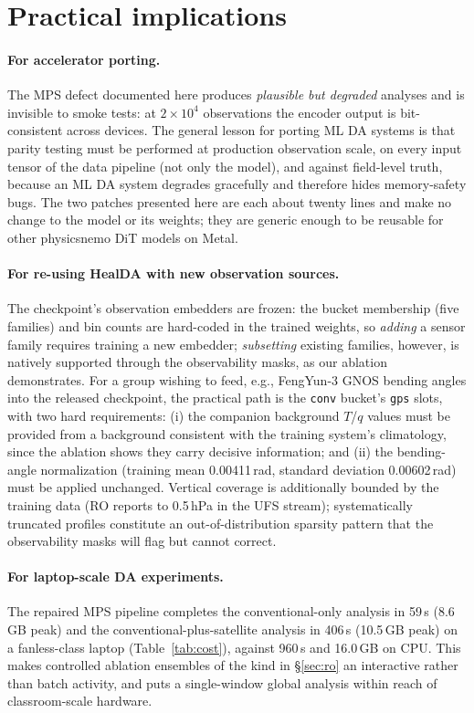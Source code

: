 \documentclass[twocolumn,11pt]{article}
\begin{document}
\section{Practical implications}\label{sec:implications}

\paragraph{For accelerator porting.} The MPS defect documented here
produces \emph{plausible but degraded} analyses and is invisible to
smoke tests: at $2\times10^{4}$ observations the encoder output is
bit-consistent across devices. The general lesson for porting ML DA
systems is that parity testing must be performed at production
observation scale, on every input tensor of the data pipeline (not
only the model), and against field-level truth, because an ML DA
system degrades gracefully and therefore hides memory-safety bugs.
The two patches presented here are each about twenty lines and make
no change to the model or its weights; they are generic enough to be
reusable for other physicsnemo DiT models on Metal.

\paragraph{For re-using HealDA with new observation sources.}
The checkpoint's observation embedders are frozen: the bucket
membership (five families) and bin counts are hard-coded in the
trained weights, so \emph{adding} a sensor family requires training a
new embedder; \emph{subsetting} existing families, however, is natively
supported through the observability masks, as our ablation
demonstrates. For a group wishing to feed, e.g., FengYun-3 GNOS
bending angles \citep{liao2016gnos} into the released checkpoint, the
practical path is the \texttt{conv} bucket's \texttt{gps} slots,
with two hard requirements: (i) the companion background $T$/$q$
values must be provided from a background consistent with the
training system's climatology, since the ablation shows they carry
decisive information; and (ii) the bending-angle normalization
(training mean \num{0.00411}\,rad, standard deviation
\num{0.00602}\,rad) must be applied unchanged. Vertical coverage is
additionally bounded by the training data (RO reports to 0.5\,hPa in
the UFS stream); systematically truncated profiles constitute an
out-of-distribution sparsity pattern that the observability masks
will flag but cannot correct.

\paragraph{For laptop-scale DA experiments.} The repaired MPS
pipeline completes the conventional-only analysis in 59\,s
(8.6\,GB peak) and the conventional-plus-satellite analysis in
406\,s (10.5\,GB peak) on a fanless-class laptop
(Table~\ref{tab:cost}), against 960\,s and 16.0\,GB on CPU. This
makes controlled ablation ensembles of the kind in
\S\ref{sec:ro} an interactive rather than batch activity, and puts a
single-window global analysis within reach of classroom-scale
hardware.
\end{document}

